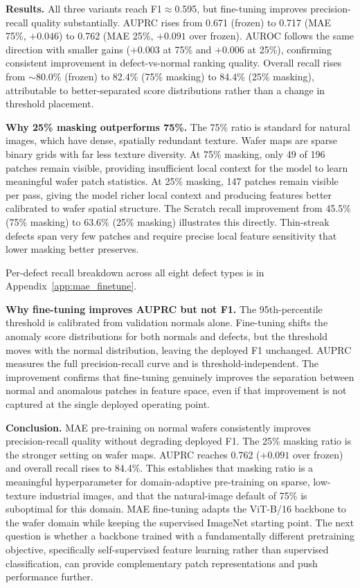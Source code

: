 \documentclass[11pt]{article}
\begin{document}
\textbf{Results.} All three variants reach F1$\approx$0.595, but fine-tuning improves precision-recall quality substantially. AUPRC rises from 0.671 (frozen) to 0.717 (MAE 75\%, $+0.046$) to 0.762 (MAE 25\%, $+0.091$ over frozen). AUROC follows the same direction with smaller gains ($+0.003$ at 75\% and $+0.006$ at 25\%), confirming consistent improvement in defect-vs-normal ranking quality. Overall recall rises from ${\sim}$80.0\% (frozen) to 82.4\% (75\% masking) to 84.4\% (25\% masking), attributable to better-separated score distributions rather than a change in threshold placement.

\textbf{Why 25\% masking outperforms 75\%.} The 75\% ratio is standard for natural images, which have dense, spatially redundant texture. Wafer maps are sparse binary grids with far less texture diversity. At 75\% masking, only 49 of 196 patches remain visible, providing insufficient local context for the model to learn meaningful wafer patch statistics. At 25\% masking, 147 patches remain visible per pass, giving the model richer local context and producing features better calibrated to wafer spatial structure. The Scratch recall improvement from 45.5\% (75\% masking) to 63.6\% (25\% masking) illustrates this directly. Thin-streak defects span very few patches and require precise local feature sensitivity that lower masking better preserves.

Per-defect recall breakdown across all eight defect types is in Appendix~\ref{app:mae_finetune}.

\textbf{Why fine-tuning improves AUPRC but not F1.} The 95th-percentile threshold is calibrated from validation normals alone. Fine-tuning shifts the anomaly score distributions for both normals and defects, but the threshold moves with the normal distribution, leaving the deployed F1 unchanged. AUPRC measures the full precision-recall curve and is threshold-independent. The improvement confirms that fine-tuning genuinely improves the separation between normal and anomalous patches in feature space, even if that improvement is not captured at the single deployed operating point.

\textbf{Conclusion.} MAE pre-training on normal wafers consistently improves precision-recall quality without degrading deployed F1. The 25\% masking ratio is the stronger setting on wafer maps. AUPRC reaches 0.762 ($+0.091$ over frozen) and overall recall rises to 84.4\%. This establishes that masking ratio is a meaningful hyperparameter for domain-adaptive pre-training on sparse, low-texture industrial images, and that the natural-image default of 75\% is suboptimal for this domain. MAE fine-tuning adapts the ViT-B/16 backbone to the wafer domain while keeping the supervised ImageNet starting point. The next question is whether a backbone trained with a fundamentally different pretraining objective, specifically self-supervised feature learning rather than supervised classification, can provide complementary patch representations and push performance further.
\end{document}
